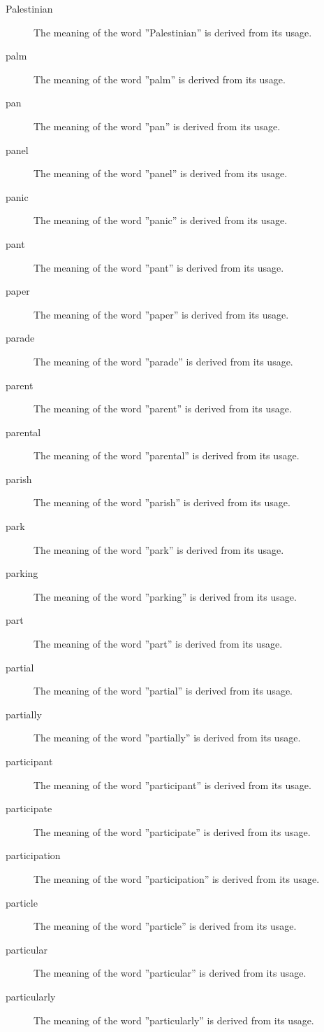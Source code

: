 \documentclass[12pt, letterpaper]{memoir}
\begin{document}
\begin{description}
\item[Palestinian] The meaning of the word ''Palestinian'' is derived from its usage.
\item[palm] The meaning of the word ''palm'' is derived from its usage.
\item[pan] The meaning of the word ''pan'' is derived from its usage.
\item[panel] The meaning of the word ''panel'' is derived from its usage.
\item[panic] The meaning of the word ''panic'' is derived from its usage.
\item[pant] The meaning of the word ''pant'' is derived from its usage.
\item[paper] The meaning of the word ''paper'' is derived from its usage.
\item[parade] The meaning of the word ''parade'' is derived from its usage.
\item[parent] The meaning of the word ''parent'' is derived from its usage.
\item[parental] The meaning of the word ''parental'' is derived from its usage.
\item[parish] The meaning of the word ''parish'' is derived from its usage.
\item[park] The meaning of the word ''park'' is derived from its usage.
\item[parking] The meaning of the word ''parking'' is derived from its usage.
\item[part] The meaning of the word ''part'' is derived from its usage.
\item[partial] The meaning of the word ''partial'' is derived from its usage.
\item[partially] The meaning of the word ''partially'' is derived from its usage.
\item[participant] The meaning of the word ''participant'' is derived from its usage.
\item[participate] The meaning of the word ''participate'' is derived from its usage.
\item[participation] The meaning of the word ''participation'' is derived from its usage.
\item[particle] The meaning of the word ''particle'' is derived from its usage.
\item[particular] The meaning of the word ''particular'' is derived from its usage.
\item[particularly] The meaning of the word ''particularly'' is derived from its usage.

\end{description}
\end{document}
